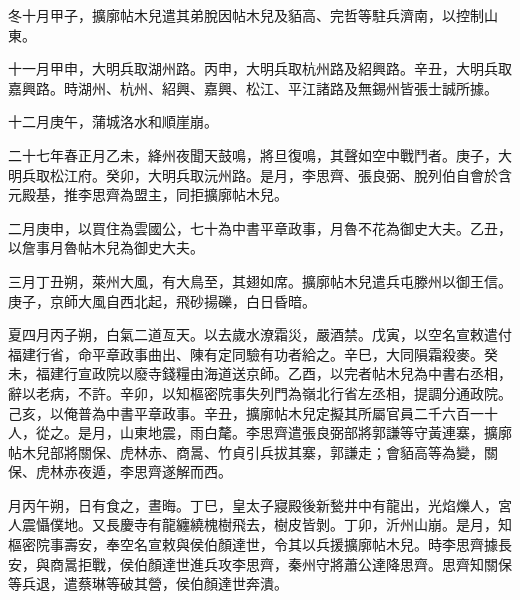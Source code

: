 \begin{pinyinscope}
 冬十月甲子，擴廓帖木兒遣其弟脫因帖木兒及貊高、完哲等駐兵濟南，以控制山東。



 十一月甲申，大明兵取湖州路。丙申，大明兵取杭州路及紹興路。辛丑，大明兵取嘉興路。時湖州、杭州、紹興、嘉興、松江、平江諸路及無錫州皆張士誠所據。



 十二月庚午，蒲城洛水和順崖崩。



 二十七年春正月乙未，絳州夜聞天鼓鳴，將旦復鳴，其聲如空中戰鬥者。庚子，大明兵取松江府。癸卯，大明兵取沅州路。是月，李思齊、張良弼、脫列伯自會於含元殿基，推李思齊為盟主，同拒擴廓帖木兒。



 二月庚申，以買住為雲國公，七十為中書平章政事，月魯不花為御史大夫。乙丑，以詹事月魯帖木兒為御史大夫。



 三月丁丑朔，萊州大風，有大鳥至，其翅如席。擴廓帖木兒遣兵屯滕州以御王信。庚子，京師大風自西北起，飛砂揚礫，白日昏暗。



 夏四月丙子朔，白氣二道亙天。以去歲水潦霜災，嚴酒禁。戊寅，以空名宣敕遣付福建行省，命平章政事曲出、陳有定同驗有功者給之。辛巳，大同隕霜殺麥。癸未，福建行宣政院以廢寺錢糧由海道送京師。乙酉，以完者帖木兒為中書右丞相，辭以老病，不許。辛卯，以知樞密院事失列門為嶺北行省左丞相，提調分通政院。己亥，以俺普為中書平章政事。辛丑，擴廓帖木兒定擬其所屬官員二千六百一十人，從之。是月，山東地震，雨白氂。李思齊遣張良弼部將郭謙等守黃連寨，擴廓帖木兒部將關保、虎林赤、商暠、竹貞引兵拔其寨，郭謙走；會貊高等為變，關保、虎林赤夜遁，李思齊遂解而西。



 月丙午朔，日有食之，晝晦。丁巳，皇太子寢殿後新甃井中有龍出，光焰爍人，宮人震懾僕地。又長慶寺有龍纏繞槐樹飛去，樹皮皆剝。丁卯，沂州山崩。是月，知樞密院事壽安，奉空名宣敕與侯伯顏達世，令其以兵援擴廓帖木兒。時李思齊據長安，與商暠拒戰，侯伯顏達世進兵攻李思齊，秦州守將蕭公達降思齊。思齊知關保等兵退，遣蔡琳等破其營，侯伯顏達世奔潰。




\end{pinyinscope}
